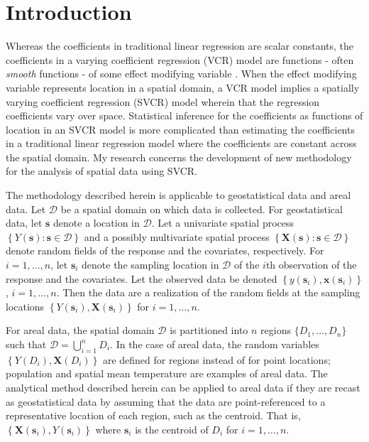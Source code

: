 \documentclass[authoryear, review, 11pt]{elsarticle}
\begin{document}
\section{Introduction}
	Whereas the coefficients in traditional linear regression are scalar constants, the coefficients in a varying coefficient regression (VCR) model are functions - often \emph{smooth} functions - of some effect modifying variable \citep{Hastie:1993a}. When the effect modifying variable represents location in a spatial domain, a VCR model implies a spatially varying coefficient regression (SVCR) model wherein that the regression coefficients vary over space. Statistical inference for the coefficients as functions of location in an SVCR model is more complicated than estimating the coefficients in a traditional linear regression model where the coefficients are constant across the spatial domain. My research concerns the development of new methodology for the analysis of spatial data using SVCR.
	
	The methodology described herein is applicable to geostatistical data and areal data. Let $\mathcal{D}$ be a spatial domain on which data is collected. For geostatistical data, let $\bm{s}$ denote a location in $\mathcal{D}$. Let a univariate spatial process $\left\{Y(\bm{s}) : \bm{s} \in \mathcal{D}\right\}$ and a possibly multivariate spatial process $\left\{\bm{X}(\bm{s}) : \bm{s} \in \mathcal{D}\right\}$ denote random fields of the response and the covariates, respectively. For $i = 1, \dots, n$, let $\bm{s}_i$ denote the sampling location in $\mathcal{D}$ of the $i$th observation of the response and the covariates. Let the observed data be denoted $\left\{y(\bm{s}_i), \bm{x}(\bm{s}_i)\right\}$, $i=1, \dots, n$. Then the data are a realization of the random fields at the sampling locations $\left\{Y(\bm{s}_i), \bm{X}(\bm{s}_i)\right\}$ for $i=1, \dots, n$.
	
	For areal data, the spatial domain $\mathcal{D}$ is partitioned into $n$ regions $\{D_1, \dots, D_n\}$ such that $\mathcal{D} = \bigcup \limits_{i=1}^n D_i$. In the case of areal data, the random variables $\left\{Y(D_i), \bm{X}(D_i)\right\}$ are defined for regions instead of for point locations; population and spatial mean temperature are examples of areal data. The analytical method described herein can be applied to areal data if they are recast as geostatistical data by assuming that the data are point-referenced to a representative location of each region, such as the centroid. That is, $\left\{\bm{X}(\bm{s}_i), Y(\bm{s}_i)\right\} $ where $\bm{s}_i$ is the centroid of $D_i$ for $i=1, \dots, n$.
	
\end{document}
